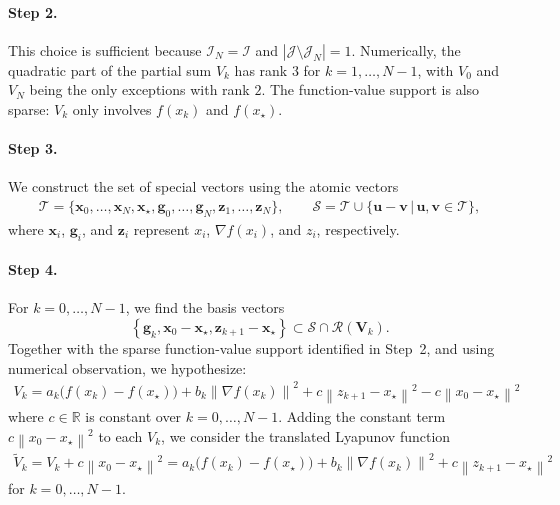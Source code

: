 \documentclass{article}
\theoremstyle{definition}
\theoremstyle{plain}
\newcommand{\vg}{{\mathbf{g}}}
\newcommand{\vu}{{\mathbf{u}}}
\newcommand{\vv}{{\mathbf{v}}}
\newcommand{\vx}{{\mathbf{x}}}
\newcommand{\vz}{{\mathbf{z}}}
\newcommand{\vV}{{\mathbf{V}}}
\newcommand{\cI}{{\mathcal{I}}}
\newcommand{\cJ}{{\mathcal{J}}}
\newcommand{\cR}{{\mathcal{R}}}
\newcommand{\cS}{{\mathcal{S}}}
\newcommand{\cT}{{\mathcal{T}}}
\newcommand{\reals}{\mathbb{R}}
\newcommand{\sqnorm}[1]{\left\| #1 \right\|^2}
\begin{document}
\paragraph{Step 2.}
This choice is sufficient because $\cI_N=\cI$ and $|\cJ\setminus\cJ_N| = 1$.
Numerically, the quadratic part of the partial sum $V_k$ has rank $3$ for $k=1,\dots,N-1$, with $V_0$ and $V_N$ being the only exceptions with rank $2$.
The function-value support is also sparse: $V_k$ only involves $f(x_k)$ and $f(x_\star)$.

\paragraph{Step 3.}
We construct the set of special vectors using the atomic vectors
\begin{align*}
    \cT
    =
    \{\vx_0,\dots,\vx_N,\vx_\star,\vg_0,\dots,\vg_N,\vz_1,\dots,\vz_N\},
    \qquad
    \cS = \cT \cup \{\vu-\vv \,|\, \vu,\vv\in\cT\},
\end{align*}
where $\vx_i$, $\vg_i$, and $\vz_i$ represent $x_i$, $\nabla f(x_i)$, and $z_i$, respectively.

\paragraph{Step 4.}
For $k=0,\dots,N-1$, we find the basis vectors
\[
    \left\{ \vg_k, \vx_0-\vx_\star, \vz_{k+1}-\vx_\star \right\} \subset \cS\cap\cR(\vV_k).
\]
Together with the sparse function-value support identified in Step~2, and using numerical observation, we hypothesize:
\begin{align*}
    V_k = a_k \bigl(f(x_k)-f(x_\star)\bigr)
    +b_k \sqnorm{\nabla f(x_k)}
    +c \sqnorm{z_{k+1}-x_\star}
    -c \sqnorm{x_0-x_\star}
\end{align*}
where $c\in \reals$ is constant over $k=0,\dots,N-1$. 
Adding the constant term $c\sqnorm{x_0 - x_\star}$ to each $V_k$, we consider the translated Lyapunov function
\begin{align*}
    \widetilde V_k
    =
    V_k + c\sqnorm{x_0-x_\star}
    =
    a_k\bigl(f(x_k)-f(x_\star)\bigr)
    +b_k\sqnorm{\nabla f(x_k)}
    +c\sqnorm{z_{k+1}-x_\star}
\end{align*}
for $k=0,\dots,N-1$.
\end{document}
